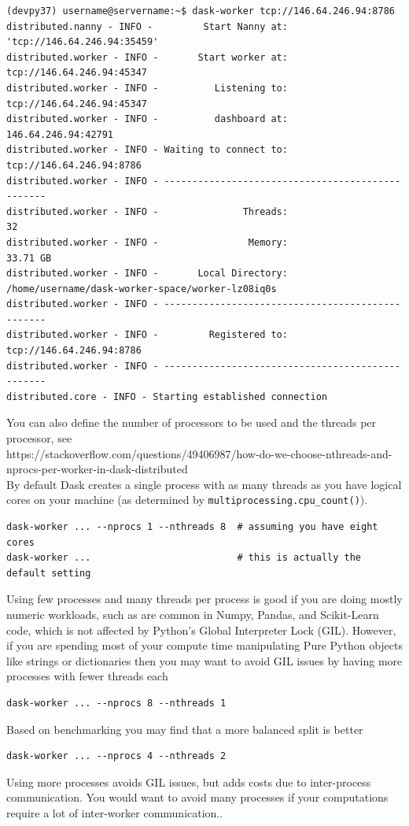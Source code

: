 \begin{enumerate}
\begin{lstlisting}[style=tinysize]
(devpy37) username@servername:~$ dask-worker tcp://146.64.246.94:8786
distributed.nanny - INFO -         Start Nanny at: 'tcp://146.64.246.94:35459'
distributed.worker - INFO -       Start worker at:  tcp://146.64.246.94:45347
distributed.worker - INFO -          Listening to:  tcp://146.64.246.94:45347
distributed.worker - INFO -          dashboard at:        146.64.246.94:42791
distributed.worker - INFO - Waiting to connect to:   tcp://146.64.246.94:8786
distributed.worker - INFO - -------------------------------------------------
distributed.worker - INFO -               Threads:                         32
distributed.worker - INFO -                Memory:                   33.71 GB
distributed.worker - INFO -       Local Directory: /home/username/dask-worker-space/worker-lz08iq0s
distributed.worker - INFO - -------------------------------------------------
distributed.worker - INFO -         Registered to:   tcp://146.64.246.94:8786
distributed.worker - INFO - -------------------------------------------------
distributed.core - INFO - Starting established connection
\end{lstlisting}

You can also define the number of processors to be used and the threads per processor, see \\ https://stackoverflow.com/questions/49406987/how-do-we-choose-nthreads-and-nprocs-per-worker-in-dask-distributed\\

By default Dask creates a single process with as many threads as you have logical cores on your machine (as determined by \lstinline{multiprocessing.cpu_count()}).
\begin{lstlisting}
dask-worker ... --nprocs 1 --nthreads 8  # assuming you have eight cores
dask-worker ...                          # this is actually the default setting
\end{lstlisting}
Using few processes and many threads per process is good if you are doing mostly numeric workloads, such as are common in Numpy, Pandas, and Scikit-Learn code, which is not affected by Python's Global Interpreter Lock (GIL).
However, if you are spending most of your compute time manipulating Pure Python objects like strings or dictionaries then you may want to avoid GIL issues by having more processes with fewer threads each
\begin{lstlisting}
dask-worker ... --nprocs 8 --nthreads 1
\end{lstlisting}
Based on benchmarking you may find that a more balanced split is better
\begin{lstlisting}
dask-worker ... --nprocs 4 --nthreads 2
\end{lstlisting}
Using more processes avoids GIL issues, but adds costs due to inter-process communication. You would want to avoid many processes if your computations require a lot of inter-worker communication..


\end{enumerate}
